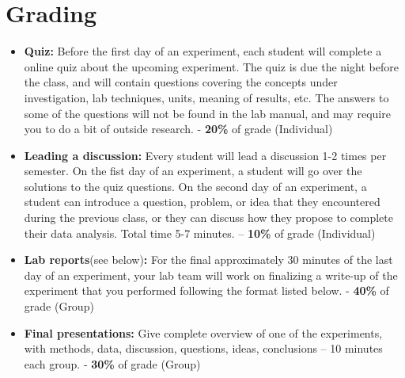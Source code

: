 \newpage

\section*{Grading}
\begin{itemize}
\itemsep0em
\item \textbf{Quiz:}  Before the first day of an experiment, each student will complete a online quiz about the upcoming experiment. The quiz is due the night before the class, and will contain questions covering the concepts under investigation, lab techniques, units, meaning of results, etc. The answers to some of the questions will not be found in the lab manual, and may require you to do a bit of outside research. \newline - \textbf{20\%} of grade (Individual)
\item \textbf{Leading a discussion:} Every student will lead a discussion 1-2 times per semester. On the fist day of an experiment, a student will go over the solutions to the quiz questions. On the second day of an experiment, a student can introduce a question, problem, or idea that they encountered during the previous class, or they can discuss how they propose to complete their data analysis. Total time 5-7 minutes. \newline – \textbf{10\%} of grade (Individual)
\item \textbf{Lab reports}(see below)\textbf{:} For the final approximately 30 minutes of the last day of an experiment, your lab team will work on finalizing a write-up of the experiment that you performed following the format listed below. \newline - \textbf{40\%} of grade (Group)
\item \textbf{Final presentations:} Give complete overview of one of the experiments, with methods, data, discussion, questions, ideas, conclusions – 10 minutes each group. \newline - \textbf{30\%} of grade (Group)
\end{itemize}

